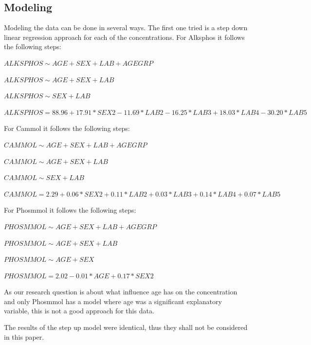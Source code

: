 \documentclass{article}
\begin{document}
    \subsection{Modeling}
      Modeling the data can be done in several ways.
      The first one tried is a step down linear regression approach for each of the concentrations.
      For Alksphos it follows the following steps:
      \begin{itemize}
        \small{\item $ALKSPHOS \sim AGE + SEX + LAB + AGEGRP$}
        \small{\item $ALKSPHOS \sim AGE + SEX + LAB$}
        \small{\item $ALKSPHOS \sim SEX + LAB$}
        \small{\item $ALKSPHOS = 88.96 + 17.91*SEX2 - 11.69*LAB2 - 16.25*LAB3 + 18.03*LAB4 - 30.20*LAB5$}
      \end{itemize}
      For Cammol it follows the following steps:
      \begin{itemize}
        \small{\item $CAMMOL \sim AGE + SEX + LAB + AGEGRP$}
        \small{\item $CAMMOL \sim AGE + SEX + LAB$}
        \small{\item $CAMMOL \sim SEX + LAB$}
        \small{\item $CAMMOL = 2.29 + 0.06*SEX2 + 0.11*LAB2 + 0.03*LAB3 + 0.14*LAB4 + 0.07*LAB5$}
      \end{itemize}
      For Phosmmol it follows the following steps:
      \begin{itemize}
        \small{\item $PHOSMMOL \sim AGE + SEX + LAB + AGEGRP$}
        \small{\item $PHOSMMOL \sim AGE + SEX + LAB$}
        \small{\item $PHOSMMOL \sim AGE + SEX$}
        \small{\item $PHOSMMOL = 2.02 - 0.01*AGE + 0.17*SEX2$}
      \end{itemize}
      As our research question is about what influence age has on the concentration and only Phosmmol has a model where age was a significant explanatory variable, this is not a good approach for this data.
      
      The results of the step up model were identical, thus they shall not be considered in this paper.
\end{document}
